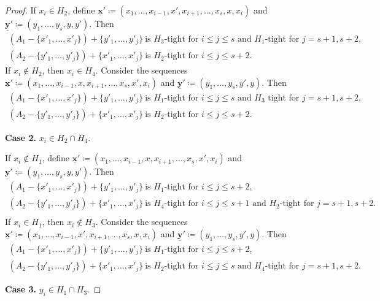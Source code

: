 \documentclass[11pt,a4paper]{article}
\theoremstyle{plain}
\theoremstyle{definition}
\newenvironment{claimproof}[1][\proofname]
  {%
    \proof[#1]%
      \renewcommand*\qedsymbol{$\bullet$}%
  }
  {%
    \endproof%
  }
\newcommand{\ul}[1]{\underline{\mathbf{#1}}}
\begin{document}
\begin{proof}
\begin{claimproof}
\noindent If $x_i \in H_2$, define $\ul{x}'\coloneqq(x_1,\dots,x_{i-1},x',x_{i+1},\dots,x_s,x,x_i)$ and $\ul{y}'\coloneqq(y_1,\dots,y_s,y,y')$. Then 
\begin{gather*}
    (A_1-\{x'_1,\dots,x'_j\})+\{y'_1,\dots,y'_j\}\ \text{is $H_3$-tight for $i \le j \le s$ and $H_1$-tight for $j=s+1,s+2$},\\
    (A_2-\{y'_1,\dots,y'_j\})+\{x'_1,\dots,x'_j\}\ \text{is $H_2$-tight for $i \le j \le s+2$}.
\end{gather*}  
If $x_i\notin H_2$, then $x_i\in H_4$. Consider the sequences $\ul{x}'\coloneqq(x_1,\dots,x_{i-1},x,x_{i+1},\dots,x_s,x',x_i)$ and $\ul{y}'\coloneqq(y_1,\dots,y_s,y',y)$. Then 
\begin{gather*}
    (A_1-\{x'_1,\dots,x'_j\})+\{y'_1,\dots,y'_j\}\ \text{is $H_1$-tight for $i \le j \le s$ and $H_3$ tight for $j=s+1,s+2$},\\
    (A_2-\{y'_1,\dots,y'_j\})+\{x'_1,\dots,x'_j\}\ \text{is $H_2$-tight for $i \le j \le s+2$}.
\end{gather*}  

\noindent\textbf{Case 2.} $x_i \in H_2 \cap H_4$.

\noindent If $x_i \notin H_1$, define $\ul{x}'\coloneqq (x_1,\dots,x_{i-1},x,x_{i+1},\dots,x_s,x',x_i)$ and $\ul{y}'\coloneqq(y_1,\dots,y_s,y,y')$. Then 
\begin{gather*}
    (A_1-\{x'_1,\dots,x'_j\})+\{y'_1,\dots,y'_j\}\ \text{is $H_1$-tight for $i \le j \le s+2$},\\
    (A_2-\{y'_1,\dots,y'_j\})+\{x'_1,\dots,x'_j\}\ \text{is $H_4$-tight for $i \le j \le s+1$ and $H_2$-tight for $j=s+1,s+2$}.\\
\end{gather*}  
If $x_i\in H_1$, then $x_i\notin H_3$. Consider the sequences $\ul{x}'\coloneqq(x_1,\dots,x_{i-1},x',x_{i+1},\dots,x_s,x,x_i)$ and $\ul{y}'\coloneqq(y_1,\dots,y_s,y',y)$. Then
\begin{gather*}
    (A_1-\{x'_1,\dots,x'_j\})+\{y'_1,\dots,y'_j\}\ \text{is $H_1$-tight for $i \le j \le s+2$},\\
    (A_2-\{y'_1,\dots,y'_j\})+\{x'_1,\dots,x'_j\}\ \text{is $H_2$-tight for $i \le j \le s$ and $H_4$-tight for $j=s+1,s+2$}.
\end{gather*}

\noindent\textbf{Case 3.} $y_i \in H_1 \cap H_3$.


\end{claimproof}
\end{proof}
\end{document}

